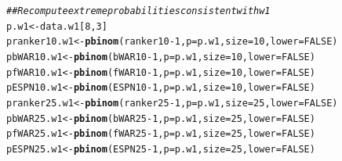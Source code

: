 \documentclass[11pt]{article}\usepackage[]{graphicx}\usepackage[]{color}
\makeatletter
\newcommand{\hlnum}[1]{\textcolor[rgb]{0.686,0.059,0.569}{#1}}%
\newcommand{\hlcom}[1]{\textcolor[rgb]{0.678,0.584,0.686}{\textit{#1}}}%
\newcommand{\hlopt}[1]{\textcolor[rgb]{0,0,0}{#1}}%
\newcommand{\hlstd}[1]{\textcolor[rgb]{0.345,0.345,0.345}{#1}}%
\newcommand{\hlkwb}[1]{\textcolor[rgb]{0.69,0.353,0.396}{#1}}%
\newcommand{\hlkwc}[1]{\textcolor[rgb]{0.333,0.667,0.333}{#1}}%
\newcommand{\hlkwd}[1]{\textcolor[rgb]{0.737,0.353,0.396}{\textbf{#1}}}%
\newenvironment{kframe}{%
 \def\at@end@of@kframe{}%
 \ifinner\ifhmode%
  \def\at@end@of@kframe{\end{minipage}}%
  \begin{minipage}{\columnwidth}%
 \fi\fi%
 \def\FrameCommand##1{\hskip\@totalleftmargin \hskip-\fboxsep
 \colorbox{shadecolor}{##1}\hskip-\fboxsep
     \hskip-\linewidth \hskip-\@totalleftmargin \hskip\columnwidth}%
 \MakeFramed {\advance\hsize-\width
   \@totalleftmargin\z@ \linewidth\hsize
   \@setminipage}}%
 {\par\unskip\endMakeFramed%
 \at@end@of@kframe}
\newenvironment{knitrout}{}{} %
\makeatother
\begin{document}
\begin{knitrout}
\color{fgcolor}\begin{kframe}
\begin{alltt}
\hlcom{## Recompute extreme probabilities consistent with w1}
\hlstd{p.w1} \hlkwb{<-} \hlstd{data.w1[}\hlnum{8}\hlstd{,} \hlnum{3}\hlstd{]}
\hlstd{pranker10.w1} \hlkwb{<-} \hlkwd{pbinom}\hlstd{(ranker10} \hlopt{-} \hlnum{1}\hlstd{,} \hlkwc{p} \hlstd{= p.w1,} \hlkwc{size} \hlstd{=} \hlnum{10}\hlstd{,} \hlkwc{lower} \hlstd{=} \hlnum{FALSE}\hlstd{)}
\hlstd{pbWAR10.w1}   \hlkwb{<-} \hlkwd{pbinom}\hlstd{(bWAR10} \hlopt{-} \hlnum{1}\hlstd{,} \hlkwc{p} \hlstd{= p.w1,} \hlkwc{size} \hlstd{=} \hlnum{10}\hlstd{,} \hlkwc{lower} \hlstd{=} \hlnum{FALSE}\hlstd{)}
\hlstd{pfWAR10.w1}   \hlkwb{<-} \hlkwd{pbinom}\hlstd{(fWAR10} \hlopt{-} \hlnum{1}\hlstd{,} \hlkwc{p} \hlstd{= p.w1,} \hlkwc{size} \hlstd{=} \hlnum{10}\hlstd{,} \hlkwc{lower} \hlstd{=} \hlnum{FALSE}\hlstd{)}
\hlstd{pESPN10.w1}   \hlkwb{<-} \hlkwd{pbinom}\hlstd{(ESPN10} \hlopt{-} \hlnum{1}\hlstd{,} \hlkwc{p} \hlstd{= p.w1,} \hlkwc{size} \hlstd{=} \hlnum{10}\hlstd{,} \hlkwc{lower} \hlstd{=} \hlnum{FALSE}\hlstd{)}
\hlstd{pranker25.w1} \hlkwb{<-} \hlkwd{pbinom}\hlstd{(ranker25} \hlopt{-} \hlnum{1}\hlstd{,} \hlkwc{p} \hlstd{= p.w1,} \hlkwc{size} \hlstd{=} \hlnum{25}\hlstd{,} \hlkwc{lower} \hlstd{=} \hlnum{FALSE}\hlstd{)}
\hlstd{pbWAR25.w1}   \hlkwb{<-} \hlkwd{pbinom}\hlstd{(bWAR25} \hlopt{-} \hlnum{1}\hlstd{,} \hlkwc{p} \hlstd{= p.w1,} \hlkwc{size} \hlstd{=} \hlnum{25}\hlstd{,} \hlkwc{lower} \hlstd{=} \hlnum{FALSE}\hlstd{)}
\hlstd{pfWAR25.w1}   \hlkwb{<-} \hlkwd{pbinom}\hlstd{(fWAR25} \hlopt{-} \hlnum{1}\hlstd{,} \hlkwc{p} \hlstd{= p.w1,} \hlkwc{size} \hlstd{=} \hlnum{25}\hlstd{,} \hlkwc{lower} \hlstd{=} \hlnum{FALSE}\hlstd{)}
\hlstd{pESPN25.w1}   \hlkwb{<-} \hlkwd{pbinom}\hlstd{(ESPN25} \hlopt{-} \hlnum{1}\hlstd{,} \hlkwc{p} \hlstd{= p.w1,} \hlkwc{size} \hlstd{=} \hlnum{25}\hlstd{,} \hlkwc{lower} \hlstd{=} \hlnum{FALSE}\hlstd{)}


\end{alltt}
\end{kframe}
\end{knitrout}
\end{document}
